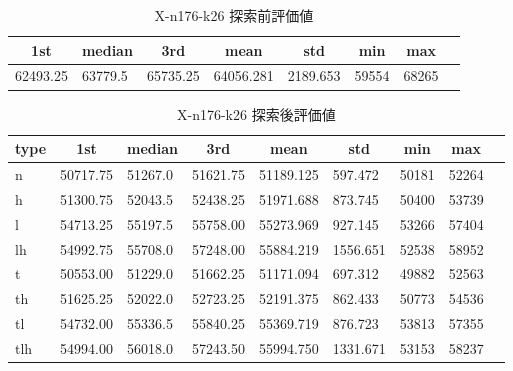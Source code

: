 \begin{table}[htbp]
    \centering
    \caption{X-n176-k26 探索前評価値}
    \begin{tabular}{|l|l|l|l|l|l|l|l|}\hline
    \multicolumn{1}{|c|}{\textbf{1st}}
    &\multicolumn{1}{c|}{\textbf{median}}
    &\multicolumn{1}{c|}{\textbf{3rd}}
    &\multicolumn{1}{c|}{\textbf{mean}}
    &\multicolumn{1}{c|}{\textbf{std}}
    &\multicolumn{1}{c|}{\textbf{min}}
    &\multicolumn{1}{c|}{\textbf{max}}\\\hline
	62493.25 & 63779.5 & 65735.25 & 64056.281 & 2189.653 & 59554 & 68265\\\hline
	\end{tabular}
\end{table}
\begin{table}[htbp]
    \centering
    \caption{X-n176-k26 探索後評価値}
    \begin{tabular}{|l|l|l|l|l|l|l|l|l|}\hline
    \multicolumn{1}{|c|}{\textbf{type}}
    &\multicolumn{1}{|c|}{\textbf{1st}}
    &\multicolumn{1}{c|}{\textbf{median}}
    &\multicolumn{1}{c|}{\textbf{3rd}}
    &\multicolumn{1}{c|}{\textbf{mean}}
    &\multicolumn{1}{c|}{\textbf{std}}
    &\multicolumn{1}{c|}{\textbf{min}}
    &\multicolumn{1}{c|}{\textbf{max}}\\\hline
	n & 50717.75 & 51267.0 & 51621.75 & 51189.125 & 597.472 & 50181 & 52264\\\hline
	h & 51300.75 & 52043.5 & 52438.25 & 51971.688 & 873.745 & 50400 & 53739\\\hline
	l & 54713.25 & 55197.5 & 55758.00 & 55273.969 & 927.145 & 53266 & 57404\\\hline
	lh & 54992.75 & 55708.0 & 57248.00 & 55884.219 & 1556.651 & 52538 & 58952\\\hline
	t & 50553.00 & 51229.0 & 51662.25 & 51171.094 & 697.312 & 49882 & 52563\\\hline
	th & 51625.25 & 52022.0 & 52723.25 & 52191.375 & 862.433 & 50773 & 54536\\\hline
	tl & 54732.00 & 55336.5 & 55840.25 & 55369.719 & 876.723 & 53813 & 57355\\\hline
	tlh & 54994.00 & 56018.0 & 57243.50 & 55994.750 & 1331.671 & 53153 & 58237\\\hline
	\end{tabular}
\end{table}
